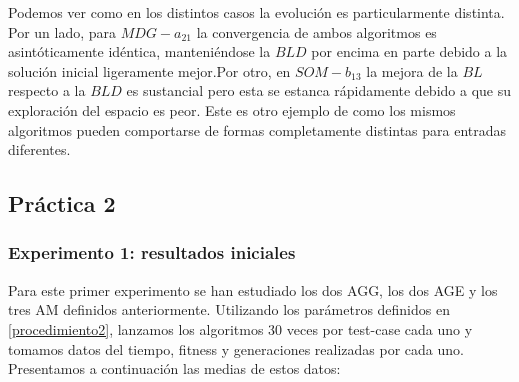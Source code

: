 \documentclass[11pt,a4paper]{article}
\begin{document}
	Podemos ver como en los distintos casos la evolución es particularmente distinta. Por un lado, para $MDG-a_21$ la convergencia de ambos algoritmos es asintóticamente idéntica, manteniéndose la $BLD$ por encima en parte debido a la solución inicial ligeramente mejor.Por otro, en $SOM-b_13$ la mejora de la $BL$ respecto a la $BLD$ es sustancial pero esta se estanca rápidamente debido a que su exploración del espacio es peor. Este es otro ejemplo de como los mismos algoritmos pueden comportarse de formas completamente distintas para entradas diferentes.

	\subsection{ Práctica 2 } \label{sec62}
	
	\subsubsection{ Experimento 1: resultados iniciales}
	
	Para este primer experimento se han estudiado los dos AGG, los dos AGE y los tres AM definidos anteriormente. Utilizando los parámetros definidos en \ref{procedimiento2}, lanzamos los algoritmos 30 veces por test-case cada uno y tomamos datos del tiempo, fitness y generaciones realizadas por cada uno. Presentamos a continuación las medias de estos datos:
	
\end{document}

